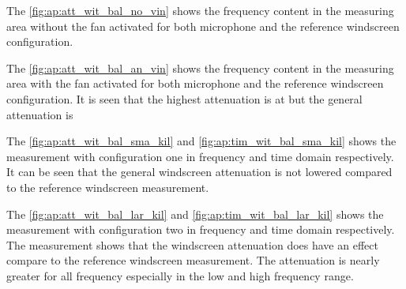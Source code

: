 The \autoref{fig:ap:att_wit_bal_no_vin} shows the frequency content in the measuring area without the fan activated for both microphone and the reference windscreen configuration.

The \autoref{fig:ap:att_wit_bal_an_vin} shows the frequency content in the measuring area with the fan activated for both microphone and the reference windscreen configuration. It is seen that the highest attenuation is at  but the general attenuation is 



The \autoref{fig:ap:att_wit_bal_sma_kil} and \autoref{fig:ap:tim_wit_bal_sma_kil} shows the measurement with configuration one in frequency and time domain respectively. It can be seen that the general windscreen attenuation is not lowered compared to the reference windscreen measurement.



The \autoref{fig:ap:att_wit_bal_lar_kil} and \autoref{fig:ap:tim_wit_bal_lar_kil} shows the measurement with configuration two in frequency and time domain respectively. The measurement shows that the windscreen attenuation does have an effect compare to the reference windscreen measurement. The attenuation is nearly greater for all frequency especially in the low and high frequency range.




